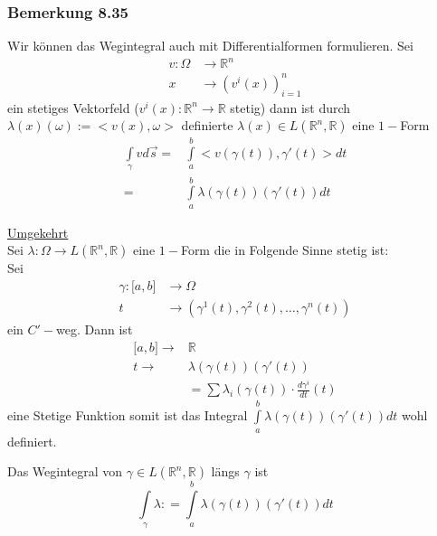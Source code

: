 \subsubsection*{Bemerkung 8.35}
Wir können das Wegintegral auch mit Differentialformen formulieren. Sei 
\begin{align*}
v:\Omega &\rightarrow\mathbb{R}^n\\
x &\rightarrow\left( v^i(x)\right)_{i=1}^n
\end{align*}
ein stetiges Vektorfeld ($v^i(x):\mathbb{R}^n\rightarrow\mathbb{R}$ stetig) dann ist durch $\lambda (x)(\omega):=< v(x),\omega >$ definierte $\lambda (x)\in L\left( \mathbb{R}^n,\mathbb{R}\right)$ eine $1-$Form
\begin{align*}
\int\limits_\gamma  {vd\vec s}  = &\int\limits_a^b { < v\left( {\gamma (t)} \right),\gamma '(t) > dt}\\
 = &\int\limits_a^b {\lambda \left( {\gamma \left( t \right)} \right)\left( {\gamma '\left( t \right)} \right)dt} 
\end{align*}

\noindent\underline{Umgekehrt}\\

\noindent Sei $\lambda :\Omega\rightarrow L\left( \mathbb{R}^n,\mathbb{R}\right)$ eine $1-$Form die in Folgende Sinne stetig ist: \\

Sei 
\begin{align*}
\gamma :\lbrack a,b\rbrack &\rightarrow\Omega\\
t &\rightarrow\left( \gamma^1 (t), \gamma^2 (t),\dots ,\gamma^n (t) \right)
\end{align*}
ein $C'-$weg. Dann ist 
\begin{align*}
\lbrack a,b\rbrack \rightarrow &\mathbb{R}\\
t\rightarrow &\lambda\left( \gamma (t)\right)\left( \gamma' (t)\right)\\
& = \sum{\lambda_i\left(\gamma(t)\right)\cdot\frac{d\gamma^i}{dt}(t)}
\end{align*}
eine Stetige Funktion somit ist das Integral $\int\limits_a^b {\lambda \left( {\gamma \left( t \right)} \right)\left( {\gamma '\left( t \right)} \right)dt} $ wohl definiert. 

\begin{definition}{8.36}
Das Wegintegral von $\gamma\in L\left( \mathbb{R}^n,\mathbb{R}\right)$ längs $\gamma$ ist \[\int\limits_\gamma  \lambda  : = \int\limits_a^b {\lambda \left( {\gamma (t)} \right)\left( {\gamma '(t)} \right)dt} \]
\end{definition}

